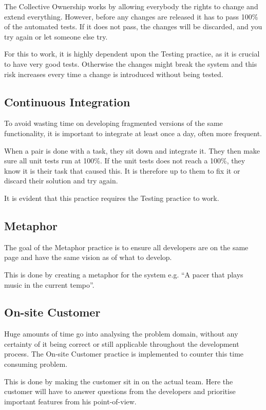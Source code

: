 The Collective Ownership works by allowing everybody the rights to change and extend everything.
However, before any changes are released it has to pass 100\% of the automated tests.
If it does not pass, the changes will be discarded, and you try again or let someone else try.

For this to work, it is highly dependent upon the Testing practice, as it is crucial to have very good tests.
Otherwise the changes might break the system and this risk increases every time a change is introduced without being tested.

\subsection{Continuous Integration}
To avoid wasting time on developing fragmented versions of the same functionality, it is important to integrate at least once a day, often more frequent.

When a pair is done with a task, they sit down and integrate it.
They then make sure all unit tests run at 100\%.
If the unit tests does not reach a 100\%, they know it is their task that caused this.
It is therefore up to them to fix it or discard their solution and try again.

It is evident that this practice requires the Testing practice to work.

\subsection{Metaphor}
The goal of the Metaphor practice is to ensure all developers are on the same page and have the same vision as of what to develop.

This is done by creating a metaphor for the system e.g. ``A pacer that plays music in the current tempo”.



\subsection{On-site Customer}
Huge amounts of time go into analysing the problem domain, without any certainty of it being correct or still applicable throughout the development process.
The On-site Customer practice is implemented to counter this time consuming problem.

This is done by making the customer sit in on the actual team.
Here the customer will have to answer questions from the developers and prioritise important features from his point-of-view.

